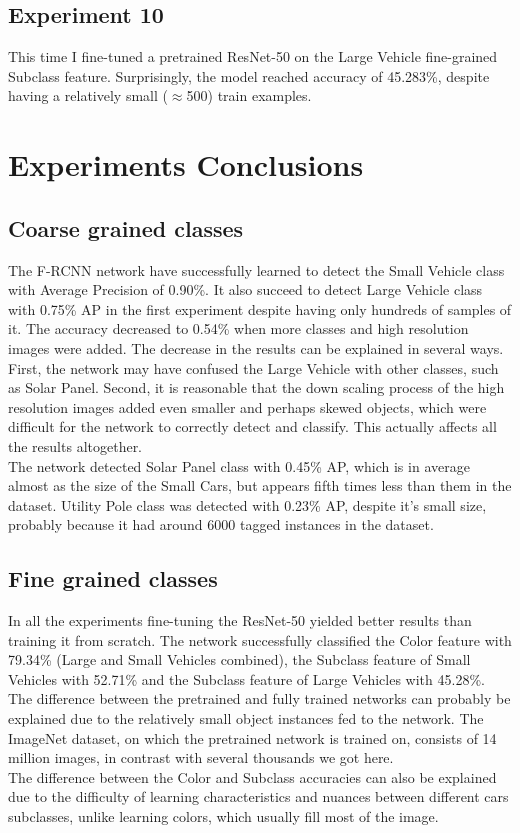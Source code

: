 \documentclass[]{article}
\begin{document}
\subsection{Experiment 10}
This time I fine-tuned a pretrained ResNet-50 on the Large Vehicle fine-grained Subclass feature. Surprisingly, the model reached accuracy of 45.283\%, despite having a relatively small ($\approx$500) train examples.

\section{Experiments Conclusions}
\subsection{Coarse grained classes}
The F-RCNN \cite{fasterrcnn} network have successfully learned to detect the Small Vehicle class with Average Precision of 0.90\%. It also succeed to detect Large Vehicle class with 0.75\% AP in the first experiment despite having only hundreds of samples of it. The accuracy decreased to 0.54\% when more classes and high resolution images were added. The decrease in the results can be explained in several ways. First, the network may have confused the Large Vehicle with other classes, such as Solar Panel. Second, it is reasonable that the down scaling process of the high resolution images added even smaller and perhaps skewed objects, which were difficult for the network to correctly detect and classify. This actually affects all the results altogether.\\
The network detected Solar Panel class with 0.45\% AP, which is in average almost as the size of the Small Cars, but appears fifth times less than them in the dataset. Utility Pole class was detected with 0.23\% AP, despite it's small size, probably because it had around 6000 tagged instances in the dataset.

\subsection{Fine grained classes}
In all the experiments fine-tuning the ResNet-50 \cite{resnet} yielded better results than training it from scratch.
The network successfully classified the Color feature with 79.34\% (Large and Small Vehicles combined), the Subclass feature of Small Vehicles with 52.71\% and the Subclass feature of Large Vehicles with 45.28\%. The difference between the pretrained and fully trained networks can probably be explained due to the relatively small object instances fed to the network. The ImageNet \cite{imagenet} dataset, on which the pretrained network is trained on, consists of 14 million images, in contrast with several thousands we got here. \\
The difference between the Color and Subclass accuracies can also be explained due to the difficulty of learning characteristics and nuances between different cars subclasses, unlike learning colors, which usually fill most of the image.
\end{document}
